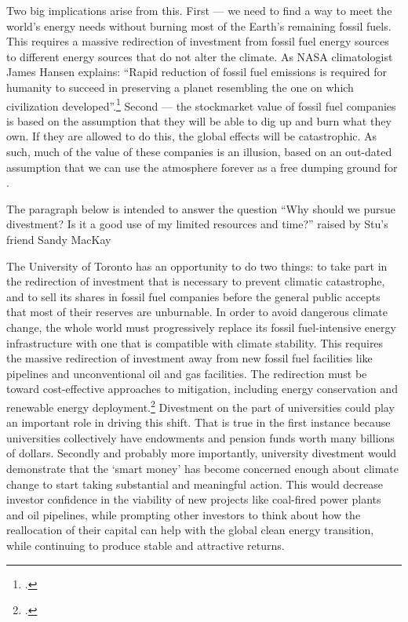 Two big implications arise from this. 
First --- we need to find a way to meet the world's energy needs without burning most of the Earth's remaining fossil fuels. 
This requires a massive redirection of investment from fossil fuel energy sources to different energy sources that do not alter the climate.
As NASA climatologist James Hansen explains: ``Rapid reduction of fossil fuel emissions is required for humanity to
succeed in preserving a planet resembling the one on which civilization developed''.\footcite[][]{HansenPaleo}
Second --- the stockmarket value of fossil fuel companies is based on the assumption that they will be able to dig up and burn what they own.
If they are allowed to do this, the global effects will be catastrophic.
As such, much of the value of these companies is an illusion, based on an out-dated assumption that we can use the atmosphere forever as a free dumping ground for .

\begin{vcom}
The paragraph below is intended to answer the question ``Why should we pursue divestment? Is it a good use of my limited resources and time?'' raised by Stu's friend Sandy MacKay
\end{vcom}


The University of Toronto has an opportunity to do two things: to take part in the redirection of investment that is necessary to prevent climatic catastrophe, and to sell its shares in fossil fuel companies before the general public accepts that most of their reserves are unburnable.
In order to avoid dangerous climate change, the whole world must progressively replace its fossil fuel-intensive energy infrastructure with one that is compatible with climate stability.
This requires the massive redirection of investment away from new fossil fuel facilities like pipelines and unconventional oil and gas facilities.
The redirection must be toward cost-effective approaches to  mitigation, including energy conservation and renewable energy deployment.\footcite[The consultancy McKinsey \& Company has studied and ranked global mitigation options, in terms of their cost, plausible deployment speed, and their capacity to mitigate greenhouse gas pollution. See: ][p. 8]{McKinseyCurve}
Divestment on the part of universities could play an important role in driving this shift.
That is true in the first instance because universities collectively have endowments and pension funds worth many billions of dollars.
Secondly and probably more importantly, university divestment would demonstrate that the `smart money' has become concerned enough about climate change to start taking substantial and meaningful action.
This would decrease investor confidence in the viability of new projects like coal-fired power plants and oil pipelines, while prompting other investors to think about how the reallocation of their capital can help with the global clean energy transition, while continuing to produce stable and attractive returns.




